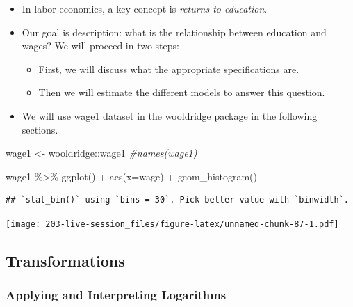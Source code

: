 \documentclass[
]{book}
\newenvironment{Shaded}{\begin{snugshade}}{\end{snugshade}}
\newcommand{\AttributeTok}[1]{\textcolor[rgb]{0.77,0.63,0.00}{#1}}
\newcommand{\CommentTok}[1]{\textcolor[rgb]{0.56,0.35,0.01}{\textit{#1}}}
\newcommand{\FunctionTok}[1]{\textcolor[rgb]{0.00,0.00,0.00}{#1}}
\newcommand{\NormalTok}[1]{#1}
\newcommand{\OtherTok}[1]{\textcolor[rgb]{0.56,0.35,0.01}{#1}}
\newcommand{\SpecialCharTok}[1]{\textcolor[rgb]{0.00,0.00,0.00}{#1}}
\providecommand{\tightlist}{%
  \setlength{\itemsep}{0pt}\setlength{\parskip}{0pt}}
\theoremstyle{definition}
\theoremstyle{definition}
\theoremstyle{definition}
\theoremstyle{definition}
\theoremstyle{remark}
\begin{document}
\begin{itemize}
\tightlist
\item
  In labor economics, a key concept is \emph{returns to education}.\\
\item
  Our goal is description: what is the relationship between education and wages? We will proceed in two steps:

  \begin{itemize}
  \tightlist
  \item
    First, we will discuss what the appropriate specifications are.
  \item
    Then we will estimate the different models to answer this question.
  \end{itemize}
\item
  We will use wage1 dataset in the wooldridge package in the following sections.
\end{itemize}

\begin{Shaded}
\begin{Highlighting}[]
\NormalTok{wage1 }\OtherTok{\textless{}{-}}\NormalTok{ wooldridge}\SpecialCharTok{::}\NormalTok{wage1}
\CommentTok{\#names(wage1)}

\NormalTok{wage1 }\SpecialCharTok{\%\textgreater{}\%} 
  \FunctionTok{ggplot}\NormalTok{() }\SpecialCharTok{+} 
  \FunctionTok{aes}\NormalTok{(}\AttributeTok{x=}\NormalTok{wage) }\SpecialCharTok{+} 
  \FunctionTok{geom\_histogram}\NormalTok{()}
\end{Highlighting}
\end{Shaded}

\begin{verbatim}
## `stat_bin()` using `bins = 30`. Pick better value with `binwidth`.
\end{verbatim}

\texttt{[image: 203-live-session\_files/figure-latex/unnamed-chunk-87-1.pdf]}

\hypertarget{transformations}{%
\subsection{Transformations}\label{transformations}}

\hypertarget{applying-and-interpreting-logarithms}{%
\subsubsection{Applying and Interpreting Logarithms}\label{applying-and-interpreting-logarithms}}
\end{document}
